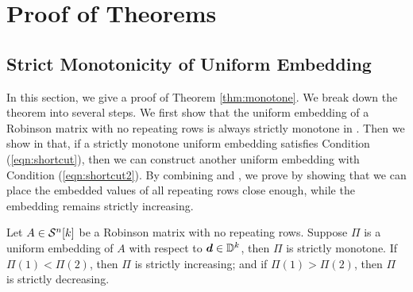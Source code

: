 \documentclass[runningheads]{llncs}
\begin{document}



\clearpage
\appendix
\section{Proof of Theorems}
\subsection{Strict Monotonicity of Uniform Embedding}\label{appendix: proof monotone}
In this section, we give a proof of Theorem \ref{thm:monotone}.
We break down the theorem into several steps.
We first show that the uniform embedding of a Robinson matrix with no repeating rows is always strictly monotone in .
Then we show in  that, if a strictly monotone uniform embedding satisfies Condition (\ref{eqn:shortcut}), then we can construct another uniform embedding with Condition (\ref{eqn:shortcut2}).
By combining  and , we prove  by showing that we can place the embedded values of all repeating rows close enough, while the embedding remains strictly increasing.

\begin{lemma}\label{lemma: no repeating}
Let $A\in\mathcal S^n[k]$ be a Robinson matrix with no repeating rows. Suppose $\Pi$ is a uniform embedding of $A$ with respect to $\boldsymbol d\in\mathbb D^k$, then $\Pi$ is strictly monotone. If $\Pi(1)<\Pi(2)$, then $\Pi$ is strictly increasing; and if $\Pi(1)>\Pi(2)$, then $\Pi$ is strictly decreasing. 
\end{lemma}
% 
\end{document}
